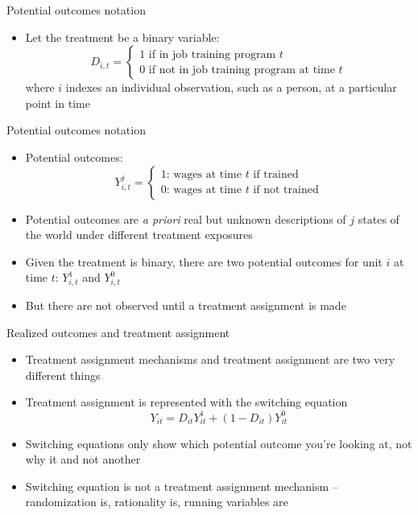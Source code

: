 \documentclass{beamer}
\begin{document}
\begin{frame}{Potential outcomes notation}
	
	\begin{itemize}
	\item Let the treatment be a binary variable: $$D_{i,t} =\begin{cases} 1 \text{ if in job training program $t$} \\ 0 \text{ if not in job training program at time $t$} \end{cases}$$where $i$ indexes an individual observation, such as a person, at a particular point in time

	\end{itemize}
\end{frame}

\begin{frame}{Potential outcomes notation}
	
	\begin{itemize}

\item Potential outcomes: $$Y_{i,t}^j =\begin{cases} 1 \text{: wages at time $t$ if trained} \\ 0 \text{: wages at time $t$ if not trained} \end{cases}$$
\item Potential outcomes are \emph{a priori} real but unknown descriptions of $j$ states of the world under different treatment exposures
\item Given the treatment is binary, there are two potential outcomes for unit $i$ at time $t$: $Y^1_{i,t}$ and $Y^0_{i,t}$
\item But there are not observed until a treatment assignment is made

	\end{itemize}
\end{frame}

\begin{frame}{Realized outcomes and treatment assignment}

\begin{itemize}
\item Treatment assignment mechanisms and treatment assignment are two very different things
\item Treatment assignment is represented with the switching equation 
 $$Y_{it}=D_{it}Y_{it}^1 + (1-D_{it})Y_{it}^0$$
 \item Switching equations only show which potential outcome you're looking at, not why it and not another
 \item Switching equation is not a treatment assignment mechanism -- randomization is, rationality is, running variables are

\end{itemize}
\end{frame}
\end{document}
